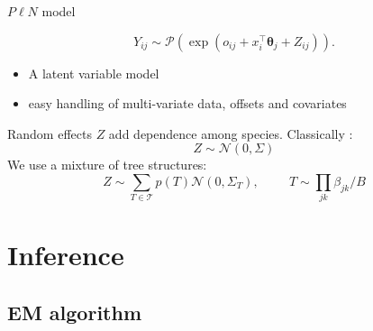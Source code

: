 \documentclass[11pt]{beamer}
\newcommand\thetab{{\boldsymbol{\theta}}}
\newcommand{\emphase}[1]{\textcolor{Complement}{#1}}
\begin{document}
\begin{frame}{$P\ell N$ model }

   \Large{ $$ Y_{ij} \sim \mathcal{P}\left(\exp(o_{ij} + x_i^\intercal \thetab_j + Z_{ij})\right).$$} \normalsize
   \begin{itemize}
       \item A latent variable model
       \item easy handling of multi-variate data, offsets and covariates\\
   \end{itemize}
   \bigskip
   Random effects $Z$  add \emphase{dependence} among species. Classically \citep{AiH89}:
   $$ Z \sim\mathcal{N}(0,\Sigma)$$
   We  use  a mixture of tree structures:
   $$ Z \sim \sum_{T\in \mathcal{T}} p(T)\mathcal{N}(0,\Sigma_T), \hspace{1cm} T \sim \prod_{jk}\beta_{jk}/B $$
   
\end{frame}


\section{Inference}
\subsection{EM algorithm}
\end{document}
